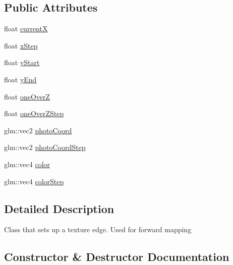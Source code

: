 \subsection*{Public Attributes}
\begin{DoxyCompactItemize}
\item 
float \hyperlink{class_texture_edge_a7c3b80e498b2695a022e27c9585ce179}{current\+X}
\item 
float \hyperlink{class_texture_edge_a25cef82338114b36eb787cf7388f51c2}{x\+Step}
\item 
float \hyperlink{class_texture_edge_aedbd23f82d3d7bcefa909a817ecd1352}{y\+Start}
\item 
float \hyperlink{class_texture_edge_a2974871a249726ee903849f14ded2bf5}{y\+End}
\item 
float \hyperlink{class_texture_edge_a6dd2c8650dd32b7150b3f6b62b338360}{one\+Over\+Z}
\item 
float \hyperlink{class_texture_edge_a074ed9078d97be9319aa786ffdcf5a2e}{one\+Over\+Z\+Step}
\item 
glm\+::vec2 \hyperlink{class_texture_edge_abb286c00988b8204557806352f3a08fb}{photo\+Coord}
\item 
glm\+::vec2 \hyperlink{class_texture_edge_abe3b2ba9ef56a213949cfd899b0bcd86}{photo\+Coord\+Step}
\item 
glm\+::vec4 \hyperlink{class_texture_edge_ab0f8a2b476e5a4bc28f7d95b0753ac69}{color}
\item 
glm\+::vec4 \hyperlink{class_texture_edge_a978d737a720ca72aac38a02e6d190c05}{color\+Step}
\end{DoxyCompactItemize}


\subsection{Detailed Description}
Class that sets up a texture edge. Used for forward mapping 

\subsection{Constructor \& Destructor Documentation}
\hypertarget{class_texture_edge_adbdc3b619799de6ef2ca4a60b072a7f7}{}
